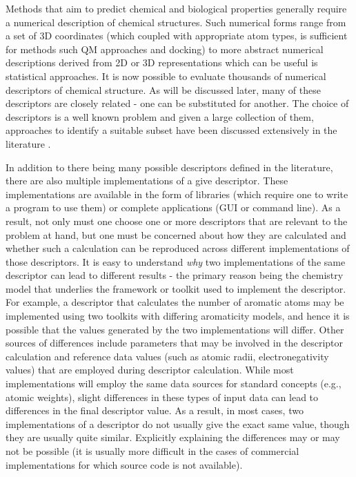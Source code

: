 \documentclass[letterpaper, 12pt]{article}
\begin{document}
Methods that aim to predict chemical and biological properties
generally require a numerical description of chemical structures. Such
numerical forms range from a set of 3D coordinates (which coupled with
appropriate atom types, is sufficient for methods such QM approaches
and docking) to more abstract numerical descriptions derived from 2D
or 3D representations which can be useful is statistical
approaches. It is now possible to evaluate thousands of numerical
descriptors of chemical structure. As will be discussed later, many of
these descriptors are closely related - one can be substituted for
another. The choice of descriptors is a well known problem and given a
large collection of them, approaches to identify a suitable subset
have been discussed extensively in the literature
\cite{Miller:2002aa,Kohavi:1997gf}.

In addition to there being many possible descriptors defined in the
literature, there are also multiple implementations of a give
descriptor. These implementations are available in the form of
libraries (which require one to write a program to use them) or
complete applications (GUI or command line). As a result, not only
must one choose one or more descriptors that are relevant to the
problem at hand, but one must be concerned about how they
are calculated and whether such a calculation can be reproduced across
different implementations of those descriptors. It is easy to
understand \emph{why} two implementations of the same descriptor can
lead to different results - the primary reason being the chemistry
model that underlies the framework or toolkit used to implement the
descriptor. For example, a descriptor that calculates the number of
aromatic atoms may be implemented using two toolkits with differing
aromaticity models, and hence it is possible that the values generated
by the two implementations will differ. Other sources of differences
include parameters that may be involved in the descriptor calculation
and reference data values (such as atomic radii, electronegativity
values) that are employed during descriptor calculation. While most
implementations will employ the same data sources for standard
concepts (e.g., atomic weights), slight differences in these types of
input data can lead to differences in the final descriptor value. As a
result, in most cases, two implementations of a descriptor do not
usually give the exact same value, though they are usually quite
similar. Explicitly explaining the differences may or may not be
possible (it is usually more difficult in the cases of commercial
implementations for which source code is not available).
\end{document}
